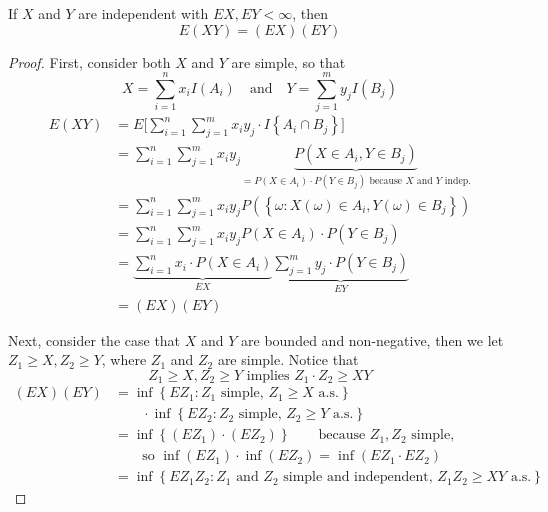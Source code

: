 
\begin{reqproof}
\begin{theorem}
    If $X$ and $Y$ are independent with $EX, EY < \infty$, then
    \[E(XY) = (EX)(EY)\]
    \begin{proof}
        First, consider both $X$ and $Y$ are simple, so that
        \[X= \sum_{i=1}^{n} x_i I(A_i) \quad \text{and} \quad Y= \sum_{j=1}^{m} y_j I(B_j)\]
        \begin{align*}
            E(XY) &= E\Big[\sum_{i=1}^{n}\sum_{j=1}^{m} x_i y_j \cdot I\left\{A_i \cap B_j\right\}\Big]\\
            &= \sum_{i=1}^{n}\sum_{j=1}^{m} x_i y_j \underbrace{P(X \in A_i, Y \in B_j)}_{\text{$= P(X\in A_i)\cdot P(Y\in B_j)$ because $X$ and $Y$ indep.}}\\
            &=\sum_{i=1}^{n}\sum_{j=1}^{m} x_i y_j P(\left\{\omega: X(\omega) \in A_i, Y(\omega) \in B_j\right\})\\
            &=\sum_{i=1}^{n}\sum_{j=1}^{m} x_i y_j P(X \in A_i)\cdot P(Y\in B_j)\\
            &=\underbrace{\sum_{i=1}^{n}x_i\cdot P(X\in A_i)}_{EX}  \underbrace{\sum_{j=1}^{m}y_j\cdot P(Y \in B_j)}_{EY}\\
            &= (EX)(EY)
        \end{align*}

Next, consider the case that $X$ and $Y$ are bounded and non-negative, then we let $Z_1\geq X, Z_2 \geq Y$, where $Z_1$ and $Z_2$ are simple. Notice that
\[Z_1 \geq X, Z_2 \geq Y \text{ implies } Z_1 \cdot Z_2 \geq XY\]
\begin{align*}
    (EX)(EY) &= \inf \left\{EZ_1: Z_1 \text{ simple, } Z_1 \geq X \text{ a.s.}\right\}\\
    &\qquad\cdot\inf\left\{EZ_2: Z_2\text{ simple, } Z_2 \geq Y \text{ a.s.}\right\}\\
    &= \inf\left\{(EZ_1) \cdot(EZ_2)\right\} \qquad \text{because $Z_1, Z_2$ simple,}\\
    &\qquad \text{so $\inf(EZ_1)\cdot\inf(EZ_2) = \inf(EZ_1 \cdot EZ_2)$}\\
    &= \inf\left\{EZ_1Z_2: Z_1 \text{ and }Z_2 \text{ simple and independent, } Z_1 Z_2\geq XY \text{ a.s.}\right\}
\end{align*}


\end{proof}
\end{theorem}
\end{reqproof}
